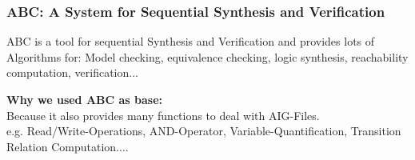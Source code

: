 \documentclass{beamer}
\begin{document}
\begin{frame}
\frametitle{ABC: A System for Sequential Synthesis and Verification}

ABC is a tool for sequential Synthesis and Verification and provides 
lots of Algorithms for: Model checking, equivalence checking, logic synthesis, 
reachability computation, verification...\\

\bigskip

\textbf{Why we used ABC as base:} \\
Because it also provides many functions to deal with AIG-Files.\\
e.g. Read/Write-Operations, AND-Operator, Variable-Quantification, 
Transition Relation Computation....








\end{frame}



\end{document}
